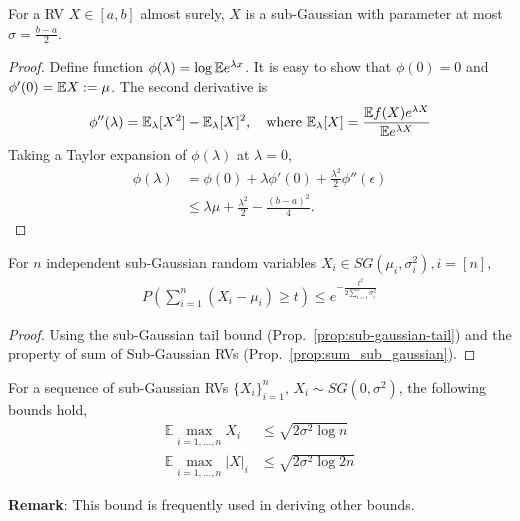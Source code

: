 \begin{property}
For a RV $X \in [a, b]$ almost surely, $X$ is a sub-Gaussian with parameter at most $\sigma = \frac{b-a}{2}$.
\end{property}
\begin{proof}
Define function $\phi(\lambda) = \log \mathbb{E} e^{\lambda x}$. It is easy to show that $\phi(0) = 0$ and $\phi'(0) = \mathbb{E} X := \mu$. The second derivative is 
$$
\phi''(\lambda) = \mathbb{E}_\lambda[X^2] -  \mathbb{E}_\lambda[X]^2, \quad \text{where}\ \mathbb{E}_\lambda[X] = \frac{\mathbb{E} f(X) e^{\lambda X}}{\mathbb{E} e^{\lambda X}} 
$$
Taking a Taylor expansion of $\phi(\lambda)$ at $\lambda=0$,
\begin{align*}
    \phi(\lambda) & =\phi(0) + \lambda \phi'(0) + \frac{\lambda^2}{2} \phi''(\epsilon) \\
    & \leq \lambda \mu + \frac{\lambda^2}{2} - \frac{(b-a)^2}{4}.
\end{align*}
\end{proof}

\begin{theorem} For $n$ independent sub-Gaussian random variables $X_i \in SG(\mu_i, \sigma_i^2), i = [n]$, 
\begin{align*}
    P\left(\sum_{i=1}^n (X_i - \mu_i) \geq t \right) \leq e^{-\frac{t^2}{2 \sum_{i=1}^n \sigma_i^2}}
\end{align*}
\end{theorem}
\begin{proof}
Using the sub-Gaussian tail bound (Prop.~\ref{prop:sub-gaussian-tail}) and the property of sum of Sub-Gaussian RVs (Prop.~\ref{prop:sum_sub_gaussian}).
\end{proof}

\begin{theorem}
For a sequence of sub-Gaussian RVs $\{X_i\}_{i=1}^n$, $X_i \sim SG(0, \sigma^2)$, the following bounds hold,
\begin{align*}
    \mathbb{E} \max _{i=1, \ldots, n} X_{i} & \leq \sqrt{2\sigma^{2} \log n}\\
    \mathbb{E} \max _{i=1, \ldots, n} |X|_{i} & \leq \sqrt{2 \sigma^{2} \log 2n}
\end{align*}
\end{theorem}
\textbf{Remark}: This bound is frequently used in deriving other bounds.

